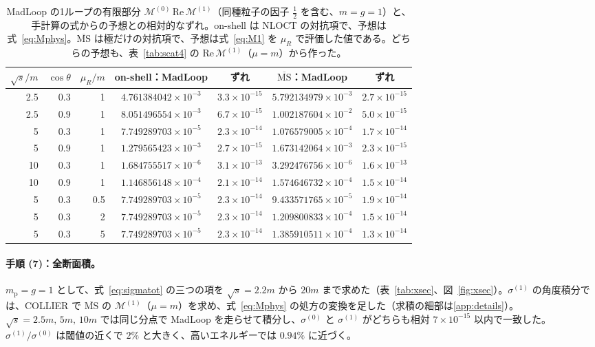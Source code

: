 \documentclass[a4paper,10pt]{ltjsarticle}
\begin{document}
\begin{table}[tbp]
\centering\small
\caption{MadLoop の1ループの有限部分 $\mathcal{M}^{(0)}\,\mathrm{Re}\,\mathcal{M}^{(1)}$（同種粒子の因子 $\frac12$ を含む、$m=g=1$）と、手計算の式からの予想との相対的なずれ。on-shell は NLOCT の対抗項で、予想は式~\eqref{eq:Mphys}。$\overline{\mathrm{MS}}$ は極だけの対抗項で、予想は式~\eqref{eq:M1} を $\mu_R$ で評価した値である。どちらの予想も、表~\ref{tab:scat4} の $\mathrm{Re}\,\mathcal{M}^{(1)}$（$\mu=m$）から作った。}
\label{tab:madloop}
\begin{tabular}{rrrcccc}
\toprule
$\sqrt s/m$ & $\cos\theta$ & $\mu_R/m$ & on-shell：MadLoop & ずれ & $\overline{\mathrm{MS}}$：MadLoop & ずれ \\
\midrule
2.5 & 0.3 & 1 & $4.761384042\times10^{-3}$ & $3.3\times10^{-15}$ & $5.792134979\times10^{-3}$ & $2.7\times10^{-15}$ \\
2.5 & 0.9 & 1 & $8.051496554\times10^{-3}$ & $6.7\times10^{-15}$ & $1.002187604\times10^{-2}$ & $5.0\times10^{-15}$ \\
5 & 0.3 & 1 & $7.749289703\times10^{-5}$ & $2.3\times10^{-14}$ & $1.076579005\times10^{-4}$ & $1.7\times10^{-14}$ \\
5 & 0.9 & 1 & $1.279565423\times10^{-3}$ & $2.7\times10^{-15}$ & $1.673142064\times10^{-3}$ & $2.3\times10^{-15}$ \\
10 & 0.3 & 1 & $1.684755517\times10^{-6}$ & $3.1\times10^{-13}$ & $3.292476756\times10^{-6}$ & $1.6\times10^{-13}$ \\
10 & 0.9 & 1 & $1.146856148\times10^{-4}$ & $2.1\times10^{-14}$ & $1.574646732\times10^{-4}$ & $1.5\times10^{-14}$ \\
\midrule
5 & 0.3 & 0.5 & $7.749289703\times10^{-5}$ & $2.3\times10^{-14}$ & $9.433571765\times10^{-5}$ & $1.9\times10^{-14}$ \\
5 & 0.3 & 2 & $7.749289703\times10^{-5}$ & $2.3\times10^{-14}$ & $1.209800833\times10^{-4}$ & $1.5\times10^{-14}$ \\
5 & 0.3 & 5 & $7.749289703\times10^{-5}$ & $2.3\times10^{-14}$ & $1.385910511\times10^{-4}$ & $1.3\times10^{-14}$ \\
\bottomrule
\end{tabular}
\end{table}

\paragraph{手順 (7)：全断面積。}$m_{\mathrm p}=g=1$ として、式~\eqref{eq:sigmatot} の三つの項を $\sqrt s=2.2m$ から $20m$ まで求めた（表~\ref{tab:xsec}、図~\ref{fig:xsec}）。$\sigma^{(1)}$ の角度積分では、COLLIER で $\overline{\mathrm{MS}}$ の $\mathcal{M}^{(1)}$（$\mu=m$）を求め、式~\eqref{eq:Mphys} の処方の変換を足した（求積の細部は\ref{app:details}）。$\sqrt s=2.5m,\,5m,\,10m$ では同じ分点で MadLoop を走らせて積分し、$\sigma^{(0)}$ と $\sigma^{(1)}$ がどちらも相対 $7\times10^{-15}$ 以内で一致した。$\sigma^{(1)}/\sigma^{(0)}$ は閾値の近くで $2\%$ と大きく、高いエネルギーでは $0.94\%$ に近づく。
\end{document}
